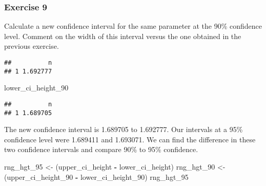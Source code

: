 \documentclass[
]{article}
\newenvironment{Shaded}{\begin{snugshade}}{\end{snugshade}}
\newcommand{\CommentTok}[1]{\textcolor[rgb]{0.56,0.35,0.01}{\textit{#1}}}
\newcommand{\DecValTok}[1]{\textcolor[rgb]{0.00,0.00,0.81}{#1}}
\newcommand{\FloatTok}[1]{\textcolor[rgb]{0.00,0.00,0.81}{#1}}
\newcommand{\KeywordTok}[1]{\textcolor[rgb]{0.13,0.29,0.53}{\textbf{#1}}}
\newcommand{\NormalTok}[1]{#1}
\newcommand{\OperatorTok}[1]{\textcolor[rgb]{0.81,0.36,0.00}{\textbf{#1}}}
\newcommand{\StringTok}[1]{\textcolor[rgb]{0.31,0.60,0.02}{#1}}
\begin{document}
\hypertarget{exercise-9}{%
\subsubsection{Exercise 9}\label{exercise-9}}

Calculate a new confidence interval for the same parameter at the 90\%
confidence level. Comment on the width of this interval versus the one
obtained in the previous exercise.

\begin{Shaded}
\end{Shaded}

\begin{verbatim}
##          n
## 1 1.692777
\end{verbatim}

\begin{Shaded}
\begin{Highlighting}[]
\NormalTok{lower_ci_height_}\DecValTok{90}
\end{Highlighting}
\end{Shaded}

\begin{verbatim}
##          n
## 1 1.689705
\end{verbatim}

The new confidence interval is 1.689705 to 1.692777. Our intervals at a
95\% confidence level were 1.689411 and 1.693071. We can find the
difference in these two confidence intervals and compare 90\% to 95\%
confidence.

\begin{Shaded}
\begin{Highlighting}[]
\NormalTok{rng_hgt_}\DecValTok{95}\NormalTok{ <-}\StringTok{ }\NormalTok{(upper_ci_height }\OperatorTok{-}\StringTok{ }\NormalTok{lower_ci_height)}
\NormalTok{rng_hgt_}\DecValTok{90}\NormalTok{ <-}\StringTok{ }\NormalTok{(upper_ci_height_}\DecValTok{90} \OperatorTok{-}\StringTok{ }\NormalTok{lower_ci_height_}\DecValTok{90}\NormalTok{)}
\NormalTok{rng_hgt_}\DecValTok{95}
\end{Highlighting}
\end{Shaded}
\end{document}

